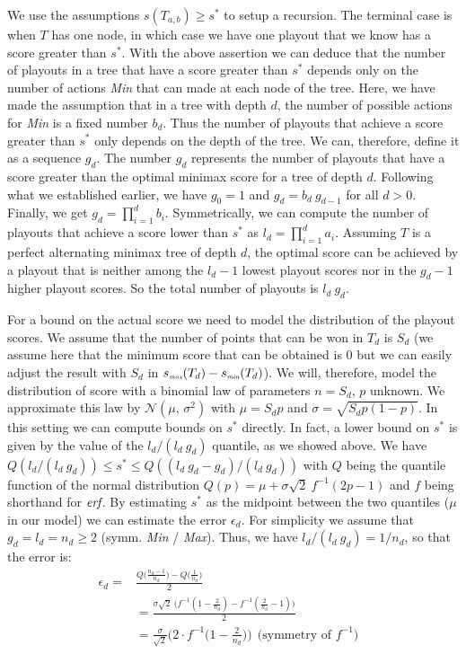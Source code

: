 \documentclass[runningheads]{llncs}
\begin{document}
We use the assumptions $s (T_{a,b}) \geq s^*$ to setup a recursion. The terminal case is when $T$ has one node, in which case we have one playout that we know has a score greater than $s^*$. With the above assertion we can deduce that the number of playouts in a tree that have a score greater than $s^*$ depends only on the number of actions \emph{Min} that can made at each node of the tree.
Here, we have made the assumption that in a tree with depth $d$, the number of possible actions for \emph{Min} is a fixed number $b_d$. Thus the number of playouts that achieve a score greater than $s^*$ only depends on the depth of the tree. We can, therefore, define it as a sequence $g_d$. The number $g_d$ represents the number of playouts that have a score greater than the optimal minimax score for a tree of depth $d$. Following what we established earlier, we have  $g_0 = 1$ and $g_d = b_d ~ g_{d-1}$ for all $d >0$.
Finally, we get $g_d = \prod^{d}_{i=1}b_i$.
Symmetrically, we can compute the number of playouts that achieve a score lower than $s^*$ as $l_d = \prod^{d}_{i=1}a_i$.
Assuming $T$ is a perfect alternating minimax tree of depth $d$, the optimal score can be achieved by a playout that is neither among the $l_d -1$ lowest playout scores nor in the $g_d -1$ higher playout scores. So the total number of playouts is $l_d~g_d$.


For a bound on the actual score we need to model the distribution of the playout scores. We assume that the number of points that can be won in $T_d$ is
$ S_d$ (we assume here that the minimum score that can be obtained is $0$ but we can easily adjust the result with $S_d$ in $s_{\mbox{\em \tiny max}}(T_d) - s_{\mbox{\em \tiny min}}(T_d) $). We will, therefore, model the distribution of score with a binomial law of parameters $n = S_d$, $p$ unknown. We approximate this law by $\mathcal{N}(\mu,\,\sigma^{2})$ with $\mu = S_dp$ and $\sigma = \sqrt{S_dp(1-p)}$. In this setting we can compute bounds on $s^*$ directly. In fact, a lower bound on $s^*$ is given by the value of the ${l_d}/(l_d~g_d)$ quantile, as we showed above. We have
$Q({l_d}/(l_d~g_d)) \leq s^* \leq Q((l_d~g_d-g_d)/(l_d~g_d))$
with $Q$ being the quantile function of the normal distribution
$Q(p) = \mu + \sigma \sqrt{2}~f^{-1}(2p-1)$
and $f$ being shorthand for $\emph{erf}$. 
By estimating $s^*$ as the midpoint between the two quantiles ($\mu$ in our model) we can estimate the error $\epsilon_d$. For simplicity we assume that $g_d = l_d = n_d \geq 2$ (symm. \emph{Min} / \emph{Max}). Thus, we have ${l_d}/(l_d~g_d) = 1/{n_d} $, so that the error is:	
\begin{align*}
	\epsilon_d =& \frac{Q\big(\frac{n_d-1}{n_d}\big) - Q\big(\frac1{n_d}\big)}{2} \\
							&= \frac{\sigma \sqrt{2}~\big(f^{-1}(1-\frac2{n_d})-f^{-1}(\frac2{n_d}-1)\big)}{2} & \\
							&= \frac{\sigma}{\sqrt{2}}\bigg(2 \cdot f^{-1}\big(1-\frac2{n_d} \big)\bigg)  \ \ \mbox{(symmetry of  $f^{-1}$)} 
\end{align*}
\end{document}
